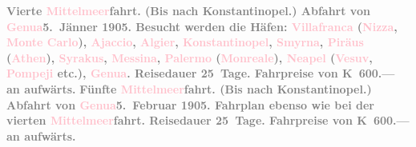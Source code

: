            \textcolor{gray}{\textbf{\textbf{Vierte \textcolor{pink}{Mittelmeer}{}\ledrightnote{\textcolor{pink}{Mittelmeer}}fahrt.}
                  (Bis nach Konstantinopel.) Abfahrt von \textcolor{pink}{Genua}{}\ledrightnote{\textcolor{pink}{Genua}}{ }\textbf{5. Jänner 1905}. Besucht werden die Häfen: \textcolor{pink}{Villafranca}{}\ledrightnote{\textcolor{pink}{Villefranche-sur-Mer}}
                     (\textcolor{pink}{Nizza}{}\ledrightnote{\textcolor{pink}{Nizza}}, \textcolor{pink}{Monte
                     Carlo}{}\ledrightnote{\textcolor{pink}{Monte Carlo}}), \textcolor{pink}{Ajaccio}{}\ledrightnote{\textcolor{pink}{Ajaccio}}, \textcolor{pink}{Algier}{}\ledrightnote{\textcolor{pink}{Algiers}}, \textcolor{pink}{Konstantinopel}{}\ledrightnote{\textcolor{pink}{Istanbul}}, \textcolor{pink}{Smyrna}{}\ledrightnote{\textcolor{pink}{Izmir}}, \textcolor{pink}{Piräus}{}\ledrightnote{\textcolor{pink}{Piraeus}} (\textcolor{pink}{Athen}{}\ledrightnote{\textcolor{pink}{Athen}}), \textcolor{pink}{Syrakus}{}\ledrightnote{\textcolor{pink}{Syrakus}}, \textcolor{pink}{Messina}{}\ledrightnote{\textcolor{pink}{Messina}}, \textcolor{pink}{Palermo}{}\ledrightnote{\textcolor{pink}{Palermo}} (\textcolor{pink}{Monreale}{}\ledrightnote{\textcolor{pink}{Monreale}}), \textcolor{pink}{Neapel}{}\ledrightnote{\textcolor{pink}{Neapel}} (\textcolor{pink}{Vesuv}{}\ledrightnote{\textcolor{pink}{Vesuv}}, \textcolor{pink}{Pompeji}{}\ledrightnote{\textcolor{pink}{Pompei}} etc.), \textcolor{pink}{Genua}{}\ledrightnote{\textcolor{pink}{Genua}}. Reisedauer 25 Tage. Fahrpreise von \textbf{K 600.—} an aufwärts.}}\pend
           \pstart
           \textcolor{gray}{\textbf{\textbf{Fünfte \textcolor{pink}{Mittelmeer}{}\ledrightnote{\textcolor{pink}{Mittelmeer}}fahrt.}
                  (Bis nach Konstantinopel.) Abfahrt von \textcolor{pink}{Genua}{}\ledrightnote{\textcolor{pink}{Genua}}{ }\textbf{5. Februar 1905}. Fahrplan ebenso wie bei der vierten \textcolor{pink}{Mittelmeer}{}\ledrightnote{\textcolor{pink}{Mittelmeer}}fahrt. Reisedauer 25 Tage. Fahrpreise von \textbf{K 600.—} an aufwärts.}}\pend
           \pstart
